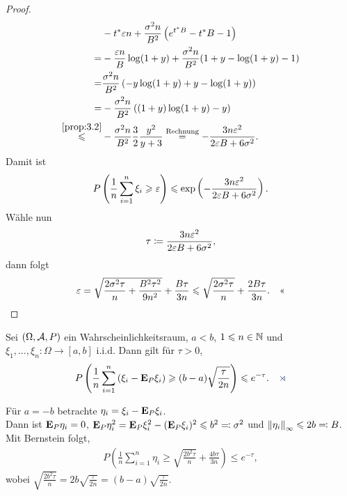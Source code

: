 \begin{proof}
\begin{align*}
&-t^* \ep n + \frac{\sigma^2 n}{B^2}\left(e^{t^*B}-t^*B-1\right)\\
= &-\frac{\ep n}{B}\log(1+y) + \frac{\sigma^2 n}{B^2}(1+y-\log(1+y)-1)\\
= &\frac{\sigma^2 n}{B^2}
\left(-y\log(1+y) + y - \log(1+y) \right)\\
= &-\frac{\sigma^2n}{B^2}\left((1+y)\log(1+y)-y \right)\\
\overset{\ref{prop:3.2}}{\le}
&-\frac{\sigma^2 n}{B^2} \frac{3}{2}\frac{y^2}{y+3}
\overset{\text{Rechnung}}{=}
- \frac{3n\ep^2}{2\ep B + 6\sigma^2}.
\end{align*}
Damit ist
\begin{align*}
P\left(\frac{1}{n}\sum_{i=1}^n \xi_i \ge \ep \right)
\le \exp \left(-\frac{3n\ep^2}{2\ep B+6\sigma^2} \right).
\end{align*}
Wähle nun
\begin{align*}
\tau \defl \frac{3n \ep^2}{2\ep B + 6\sigma^2},
\end{align*}
dann folgt
\begin{align*}
\ep = \sqrt{\frac{2\sigma^2\tau}{n} + \frac{B^2\tau^2}{9n^2}} + \frac{B\tau}{3n}
\le \sqrt{\frac{2\sigma^2\tau}{n}} + \frac{2B\tau}{3n}.\qedhere
\end{align*}
\end{proof}

\begin{prop}
\label{prop:3.4}
Sei $(\Omega,\AA,P)$ ein Wahrscheinlichkeitsraum, $a<b$, $1\le n\in\N$ und
$\xi_1,\ldots,\xi_n : \Omega\to[a,b]$ i.i.d. Dann gilt für $\tau >0$,
\begin{align*}
P \left(\frac{1}{n}\sum_{i=1}^n \left(\xi_i - \E_P \xi_i\right)\ge
(b-a)\sqrt{\frac{\tau}{2n}} \right) \le e^{-\tau}.\fishhere
\end{align*}
\end{prop}
\begin{bem*}[Beobachtung.]
Für $a=-b$ betrachte $\eta_i = \xi_i - \E_P\xi_i$.\\
Dann ist $\E_P\eta_i = 0$, $\E_P\eta_i^2 = \E_P\xi_i^2 - (\E_P\xi_i)^2 \le b^2
\defr \sigma^2$ und $\norm{\eta_i}_\infty \le 2b \defr B$. Mit Bernstein folgt,
\begin{align*}
P\left(\frac{1}{n}\sum_{i=1}^n \eta_i \ge \sqrt{\frac{2b^2\tau}{n}} +
\frac{4b\tau}{3n} \right) \le e^{-\tau},
\end{align*}
wobei $\sqrt{\frac{2b^2\tau}{n}} = 2b\sqrt{\frac{\tau}{2n}} =
(b-a)\sqrt{\frac{\tau}{2n}}$.\maphere
\end{bem*}

